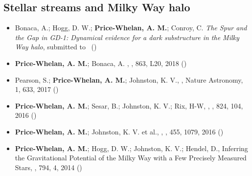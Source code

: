 \documentclass[12pt, letterpaper]{apw-cv}
\begin{document}
\subsection*{Stellar streams and Milky Way halo}
    \begin{itemize}

\item Bonaca, A.; Hogg, D. W.; {\bf Price-Whelan, A. M.}; Conroy, C.
    \textit{The Spur and the Gap in GD-1: Dynamical evidence for a dark substructure in the Milky Way halo},
    submitted to \apj\ ()

\item {\bf Price-Whelan, A. M.}; Bonaca, A.
    ,
    \apj, 863, L20, 2018 ()


\item Pearson, S.; {\bf Price-Whelan, A. M.}; Johnston, K. V.,
    ,
    Nature Astronomy, 1, 633, 2017 ()

\item {\bf Price-Whelan, A. M.}; Sesar, B.; Johnston, K. V.; Rix, H-W,
    ,
    \apj, 824, 104, 2016 ()


\item {\bf Price-Whelan, A. M.}; Johnston, K. V. et al.,
    ,
    \mnras, 455, 1079, 2016 ()

\item {\bf Price-Whelan, A. M.}; Hogg, D. W.; Johnston, K. V.; Hendel, D.,
    {Inferring the Gravitational Potential of the Milky Way with a Few Precisely Measured Stars},
    \apj, 794, 4, 2014 ()

    \end{itemize}
\end{document}
